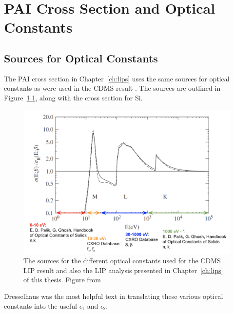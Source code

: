
\chapter{PAI Cross Section and Optical Constants}

\label{app:cross_section}

\section{Sources for Optical Constants}
The \ac{PAI} cross section in Chapter~\ref{ch:lips} uses the same sources for optical constants as were used in the \ac{CDMS} result \cite{Agnese2015} \cite{Prasad2013}. The sources are outlined in Figure~\ref{fig:const_sources}, along with the cross section for Si.

\begin{figure}[htbp]
\begin{center}
\includegraphics[width=\textwidth]{figures/app/const_sources.png}
\caption{ The sources for the different optical constants used for the \acs{CDMS} \acs{LIP} result and also the \acs{LIP} analysis presented in Chapter~\ref{ch:lips} of this thesis. Figure from \cite{Bichsel:2006}. }
\label{fig:const_sources}
\end{center}
\end{figure}

Dresselhaus \cite{Dresselhaus1966} was the most helpful text in translating these various optical constants into the useful $\epsilon_{1}$ and $\epsilon_{2}$.

